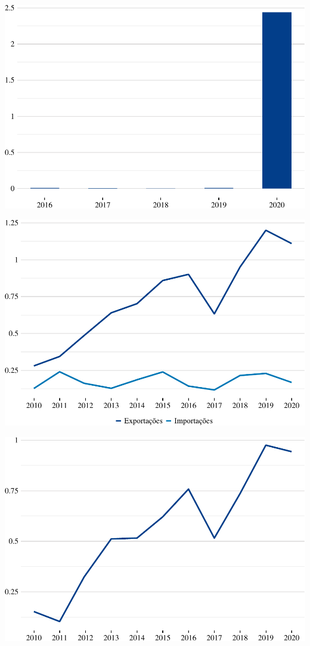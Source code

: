 \includegraphics{fig/inst1-1.pdf}

\includegraphics{fig/total-1.pdf}

\includegraphics{fig/sal1-1.pdf}
